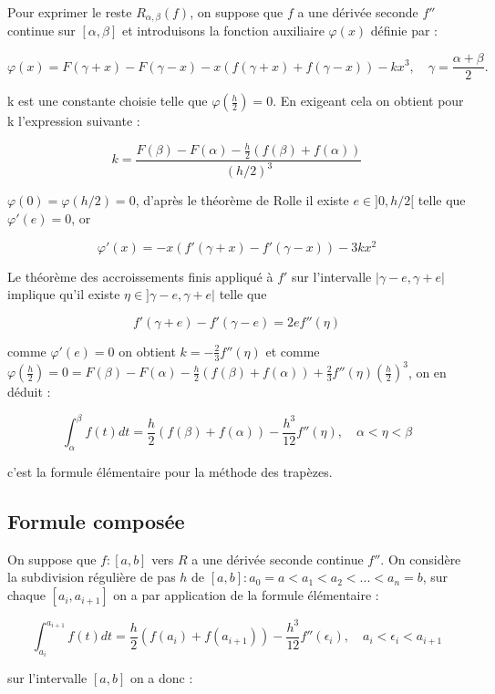 Pour exprimer le reste \( R_{\alpha, \beta}(f) \), on suppose que \( f \) a une dérivée seconde \( f'' \) continue sur \( [\alpha, \beta] \) et introduisons la fonction auxiliaire \( \varphi(x) \) définie par :

\[
\varphi(x) = F(\gamma + x) - F(\gamma - x) - x(f(\gamma + x) + f(\gamma - x)) - kx^3, \quad \gamma = \frac{\alpha + \beta}{2}. \tag{5.4}
\]

k est une constante choisie telle que \( \varphi(\frac{h}{2}) = 0 \). En exigeant cela on obtient pour k l'expression suivante :

\[
k = \frac{F(\beta) - F(\alpha) - \frac{h}{2}(f(\beta) + f(\alpha))}{(h/2)^3}
\]

\( \varphi(0) = \varphi(h/2) = 0 \), d'après le théorème de Rolle il existe \( e \in ]0, h/2[ \) telle que \( \varphi'(e) = 0 \), or

\[
\varphi'(x) = -x(f'(\gamma + x) - f'(\gamma - x)) - 3kx^2
\]

Le théorème des accroissements finis appliqué à \( f' \) sur l'intervalle \( |\gamma - e, \gamma + e| \) implique qu'il existe \( \eta \in ]\gamma - e, \gamma + e| \) telle que

\[
f'(\gamma + e) - f'(\gamma - e) = 2ef''(\eta)
\]

comme \( \varphi'(e) = 0 \) on obtient \( k = -\frac{2}{3}f''(\eta) \) et comme \( \varphi(\frac{h}{2}) = 0 = F(\beta) - F(\alpha) - \frac{h}{2}(f(\beta) + f(\alpha)) + \frac{2}{3}f''(\eta)(\frac{h}{2})^3 \), on en déduit :

\[
\displaystyle\int_{\alpha}^{\beta} f(t)dt = \frac{h}{2}(f(\beta) + f(\alpha)) - \frac{h^3}{12}f''(\eta), \quad \alpha < \eta < \beta
\]

c'est la formule élémentaire pour la méthode des trapèzes.

\subsection{Formule composée}
On suppose que \( f : [a, b] \) vers \( R \) a une dérivée seconde continue \( f'' \). On considère la subdivision régulière de pas \( h \) de \([a, b]: a_0 = a < a_1 < a_2 < ... < a_n = b \), sur chaque \([a_i, a_{i+1}]\) on a par application de la formule élémentaire :

\[
\displaystyle\int_{a_i}^{a_{i+1}} f(t)dt = \frac{h}{2} (f(a_i) + f(a_{i+1})) - \frac{h^3}{12} f''(\epsilon_i), \quad a_i < \epsilon_i < a_{i+1}
\]

sur l'intervalle \([a, b]\) on a donc :

